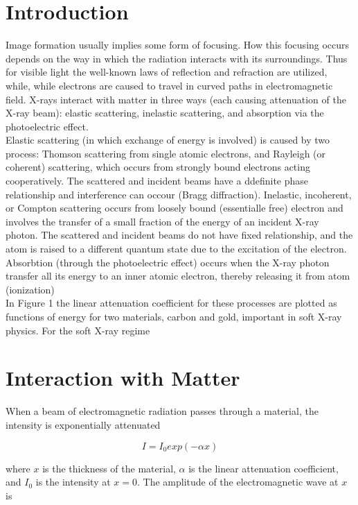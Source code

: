 \section{Introduction}
Image formation usually implies some form of focusing. How this focusing occurs depends on the way in which the radiation interacts with its surroundings. Thus for visible light the well-known laws of reflection and refraction are utilized, while, while electrons are caused to travel in curved paths in electromagnetic field. X-rays interact with matter in three ways (each causing attenuation of the X-ray beam): elastic scattering, inelastic scattering, and absorption via the photoelectric effect.
\\
Elastic scattering (in which exchange of energy is involved) is caused by two process: Thomson scattering from single atomic electrons, and Rayleigh (or coherent) scattering, which occurs from strongly bound electrons acting cooperatively. The scattered and incident beams have a ddefinite phase relationship and interference can occour (Bragg diffraction). Inelastic, incoherent, or Compton scattering occurs from loosely bound (essentialle free) electron and involves the transfer of a small fraction of the energy of an incident X-ray photon. The scattered and incident beams do not have fixed relationship, and the atom is raised to a different quantum state due to the excitation of the electron. Absorbtion (through the photoelectric effect) occurs when the X-ray photon transfer all its energy to an inner atomic electron, thereby releasing it from atom (ionization)
\\
In Figure 1 the linear attenuation coefficient for these processes are plotted as functions of energy for two materials, carbon and gold, important in soft X-ray physics. For the soft X-ray regime


\section{Interaction with Matter}
When a beam of electromagnetic radiation passes through a material, the intensity is exponentially attenuated

\begin{equation}
I = I_0 exp(-\alpha x)
\label{eq: intensity}
\end{equation}

\begin{flushleft}
where $x $ is the thickness of the material, $\alpha$ is the linear attenuation coefficient, and $I_0$ is the intensity at $x=0$. The amplitude of the electromagnetic wave at $x$ is
\end{flushleft}

